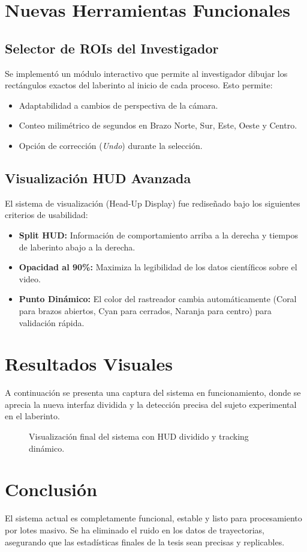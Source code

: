 \documentclass[12pt,a4paper]{article}
\begin{document}
\section{Nuevas Herramientas Funcionales}

\subsection{Selector de ROIs del Investigador}
Se implementó un módulo interactivo que permite al investigador dibujar los rectángulos exactos del laberinto al inicio de cada proceso. Esto permite:
\begin{itemize}
    \item Adaptabilidad a cambios de perspectiva de la cámara.
    \item Conteo milimétrico de segundos en Brazo Norte, Sur, Este, Oeste y Centro.
    \item Opción de corrección (\textit{Undo}) durante la selección.
\end{itemize}

\subsection{Visualización HUD Avanzada}
El sistema de visualización (Head-Up Display) fue rediseñado bajo los siguientes criterios de usabilidad:
\begin{itemize}
    \item \textbf{Split HUD:} Información de comportamiento arriba a la derecha y tiempos de laberinto abajo a la derecha.
    \item \textbf{Opacidad al 90\%:} Maximiza la legibilidad de los datos científicos sobre el video.
    \item \textbf{Punto Dinámico:} El color del rastreador cambia automáticamente (Coral para brazos abiertos, Cyan para cerrados, Naranja para centro) para validación rápida.
\end{itemize}

\section{Resultados Visuales}
A continuación se presenta una captura del sistema en funcionamiento, donde se aprecia la nueva interfaz dividida y la detección precisa del sujeto experimental en el laberinto.

\begin{figure}[h]
    \centering
    \centering
    \caption{Visualización final del sistema con HUD dividido y tracking dinámico.}
\end{figure}

\section{Conclusión}
El sistema actual es completamente funcional, estable y listo para procesamiento por lotes masivo. Se ha eliminado el ruido en los datos de trayectorias, asegurando que las estadísticas finales de la tesis sean precisas y replicables.
\end{document}
